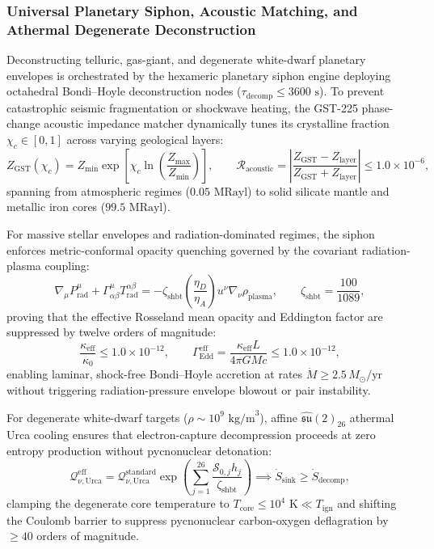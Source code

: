 \documentclass[11pt,onecolumn]{article}
\begin{document}
\subsubsection{Universal Planetary Siphon, Acoustic Matching, and Athermal Degenerate Deconstruction}
Deconstructing telluric, gas-giant, and degenerate white-dwarf planetary envelopes is orchestrated by the hexameric planetary siphon engine deploying octahedral Bondi--Hoyle deconstruction nodes ($\tau_{\text{decomp}} \le 3600\text{ s}$). To prevent catastrophic seismic fragmentation or shockwave heating, the GST-225 phase-change acoustic impedance matcher dynamically tunes its crystalline fraction $\chi_c \in [0, 1]$ across varying geological layers:
\begin{equation}
Z_{\text{GST}}(\chi_c) = Z_{\text{min}} \exp\left[ \chi_c \ln\left( \frac{Z_{\text{max}}}{Z_{\text{min}}} \right) \right], \qquad \mathcal{R}_{\text{acoustic}} = \left| \frac{Z_{\text{GST}} - Z_{\text{layer}}}{Z_{\text{GST}} + Z_{\text{layer}}} \right| \le 1.0 \times 10^{-6},
\label{eq:gst_acoustic_match}
\end{equation}
spanning from atmospheric regimes ($0.05\text{ MRayl}$) to solid silicate mantle and metallic iron cores ($99.5\text{ MRayl}$).

For massive stellar envelopes and radiation-dominated regimes, the siphon enforces metric-conformal opacity quenching governed by the covariant radiation-plasma coupling:
\begin{equation}
\nabla_\mu P_{\text{rad}}^\mu + \Gamma_{\alpha\beta}^\mu T_{\text{rad}}^{\alpha\beta} = -\zeta_{\text{shbt}} \left( \frac{\eta_D}{\eta_A} \right) u^\nu \nabla_\nu \rho_{\text{plasma}}, \qquad \zeta_{\text{shbt}} = \frac{100}{1089},
\label{eq:metric_opacity_quenching}
\end{equation}
proving that the effective Rosseland mean opacity and Eddington factor are suppressed by twelve orders of magnitude:
\begin{equation}
\frac{\kappa_{\text{eff}}}{\kappa_0} \le 1.0 \times 10^{-12}, \qquad \Gamma_{\text{Edd}}^{\text{eff}} = \frac{\kappa_{\text{eff}} L}{4\pi G M c} \le 1.0 \times 10^{-12},
\end{equation}
enabling laminar, shock-free Bondi--Hoyle accretion at rates $\dot{M} \ge 2.5\,M_\odot/\text{yr}$ without triggering radiation-pressure envelope blowout or pair instability.

For degenerate white-dwarf targets ($\rho \sim 10^9\text{ kg/m}^3$), affine $\hat{\mathfrak{su}}(2)_{26}$ athermal Urca cooling ensures that electron-capture decompression proceeds at zero entropy production without pycnonuclear detonation:
\begin{equation}
\mathcal{Q}_{\nu,\text{Urca}}^{\text{eff}} = \mathcal{Q}_{\nu,\text{Urca}}^{\text{standard}} \exp\left( \sum_{j=1}^{26} \frac{\mathcal{S}_{0,j} h_j}{\zeta_{\text{shbt}}} \right) \implies \dot{S}_{\text{sink}} \ge \dot{S}_{\text{decomp}},
\label{eq:athermal_urca_cooling}
\end{equation}
clamping the degenerate core temperature to $T_{\text{core}} \le 10^4\text{ K} \ll T_{\text{ign}}$ and shifting the Coulomb barrier to suppress pycnonuclear carbon-oxygen deflagration by $\ge 40$ orders of magnitude.
\end{document}
